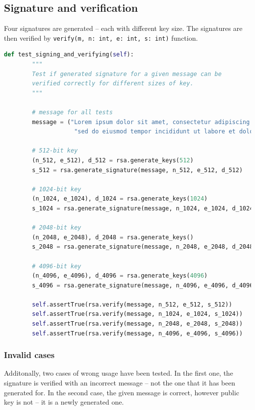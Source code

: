 \documentclass{article}
\begin{document}
\normalsize

\subsection{Signature and verification}
Four signatures are generated -- each with different key size. The
signatures are then verified by \texttt{verify(m, n: int, e: int, s: int)} function.

\small

\begin{lstlisting}[language=Python]
    def test_signing_and_verifying(self):
        """
        Test if generated signature for a given message can be
        verified correctly for different sizes of key.
        """

        # message for all tests
        message = ("Lorem ipsum dolor sit amet, consectetur adipiscing elit, ",
                    "sed do eiusmod tempor incididunt ut labore et dolore magna aliqua.")

        # 512-bit key
        (n_512, e_512), d_512 = rsa.generate_keys(512)
        s_512 = rsa.generate_signature(message, n_512, e_512, d_512)

        # 1024-bit key
        (n_1024, e_1024), d_1024 = rsa.generate_keys(1024)
        s_1024 = rsa.generate_signature(message, n_1024, e_1024, d_1024)

        # 2048-bit key
        (n_2048, e_2048), d_2048 = rsa.generate_keys()
        s_2048 = rsa.generate_signature(message, n_2048, e_2048, d_2048)

        # 4096-bit key
        (n_4096, e_4096), d_4096 = rsa.generate_keys(4096)
        s_4096 = rsa.generate_signature(message, n_4096, e_4096, d_4096)

        self.assertTrue(rsa.verify(message, n_512, e_512, s_512))
        self.assertTrue(rsa.verify(message, n_1024, e_1024, s_1024))
        self.assertTrue(rsa.verify(message, n_2048, e_2048, s_2048))
        self.assertTrue(rsa.verify(message, n_4096, e_4096, s_4096))
\end{lstlisting}

\normalsize

\subsubsection{Invalid cases}
Additonally, two cases of wrong usage have been tested. In the first one, the signature is verified with
an incorrect message -- not the one that it has been generated for. In the second case, the given message is correct,
however public key is not -- it is a newly generated one.
\end{document}
